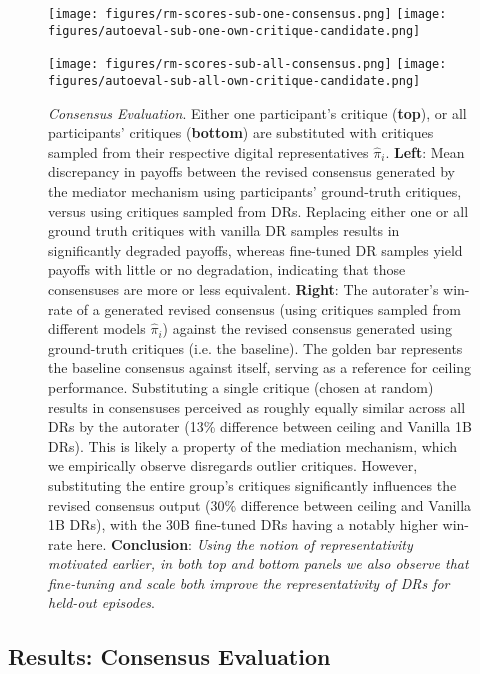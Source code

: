 \begin{figure}[htbp]
\centerline{
\texttt{[image: figures/rm-scores-sub-one-consensus.png]}
\texttt{[image: figures/autoeval-sub-one-own-critique-candidate.png]}
}
\centerline{
\texttt{[image: figures/rm-scores-sub-all-consensus.png]}
\texttt{[image: figures/autoeval-sub-all-own-critique-candidate.png]}
}
\vspace{-0.1cm}
\caption{
\textit{Consensus Evaluation}. Either one participant's critique (\textbf{top}), or all participants' critiques (\textbf{bottom}) are substituted with critiques sampled from their respective digital representatives $\hat{\pi}_{i}$.
%
\textbf{Left}: Mean discrepancy in payoffs between the revised consensus generated by the mediator mechanism using participants' ground-truth critiques, versus using critiques sampled from DRs. Replacing either one or all ground truth critiques with vanilla DR samples results in significantly degraded payoffs, whereas fine-tuned DR samples yield payoffs with little or no degradation, indicating that those consensuses are more or less equivalent.
%
\textbf{Right}: The autorater's win-rate of a generated revised consensus (using critiques sampled from different models $\hat{\pi}_{i}$) against the revised consensus generated using ground-truth critiques (i.e. the baseline). The golden bar represents the baseline consensus against itself, serving as a reference for ceiling performance. Substituting a single critique (chosen at random) results in consensuses perceived as roughly equally similar across all DRs by the autorater (13\% difference between ceiling and Vanilla 1B DRs). This is likely a property of the mediation mechanism, which we empirically observe disregards outlier critiques. However, substituting the entire group's critiques significantly influences the revised consensus output (30\% difference between ceiling and Vanilla 1B DRs), with the 30B fine-tuned DRs having a notably higher win-rate here.
%
\textbf{Conclusion}: \textit{Using the notion of representativity motivated earlier, in both top and bottom panels we also observe that fine-tuning and scale both improve the representativity of DRs for held-out episodes}.
}
\label{fig:consensus-eval}
\vspace{-0.6cm}
\end{figure}

\subsection{Results: Consensus Evaluation}

